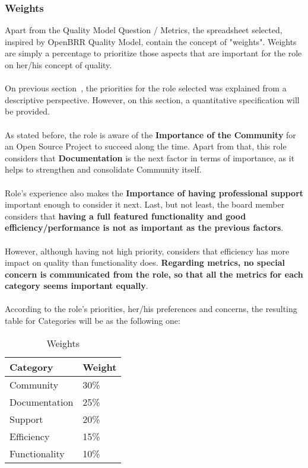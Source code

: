\documentclass[11pt]{article}
\begin{document}
\subsubsection{Weights}\label{sec:weights}
Apart from the Quality Model Question / Metrics, the spreadsheet selected, inspired by OpenBRR Quality Model, contain the concept of "weights". Weights are simply a percentage to prioritize those aspects that are important for the role on her/his concept of quality. \\
\\
On previous section~, the priorities for the role selected was explained from a descriptive perspective. However, on this section, a quantitative specification will be provided.\\
\\
As stated before, the role is aware of the \textbf{Importance of the Community} for an Open Source Project to succeed along the time. Apart from that, this role considers that \textbf{Documentation} is the next factor in terms of importance, as it helps to strengthen and consolidate Community itself.\\
\\
Role's experience also makes the \textbf{Importance of having professional support} important enough to consider it next. Last, but not least, the board member considers that \textbf{having a full featured functionality and good efficiency/performance is not as important as the previous factors}.\\
\\
However, although having not high priority, considers that efficiency has more impact on quality than functionality does. \textbf{Regarding metrics, no special concern is communicated from the role, so that all the metrics for each category seems important equally}.\\
\\
According to the role's priorities, her/his preferences and concerns, the resulting table for Categories will be as the following one:
\begin{table}[H]
  \begin{center}
    \begin{tabular}{ | l | l | }
    \toprule
    \textbf{Category} & \textbf{Weight} \\
    \hline
    Community & 30\%\\
    Documentation & 25\% \\
    Support & 20\% \\
    Efficiency & 15\% \\
    Functionality & 10\% \\
    \bottomrule
    \end{tabular}
    \caption{Weights}
    \label{tab:weights}
  \end{center}
\end{table}
\end{document}
